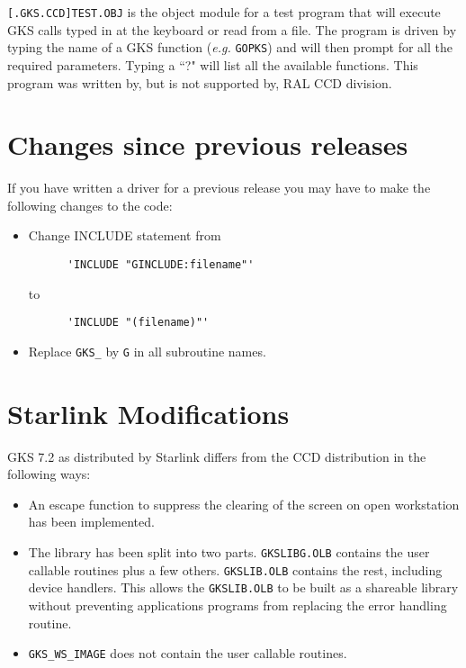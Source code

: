 {\tt [.GKS.CCD]TEST.OBJ} is the object module for a test program that will
execute GKS calls typed in at the keyboard or read from a file. The program is
driven by typing the name of a GKS function ({\em e.g.} {\tt GOPKS}) and will
then prompt for all the required parameters. Typing a ``?" will list all the
available functions. This program was written by, but is not supported by, RAL
CCD division.

\section{Changes since previous releases}

If you have written a driver for a previous release you may have to make the
following changes to the code:

\begin{itemize}

\item Change INCLUDE statement from 
\begin{verbatim}
      'INCLUDE "GINCLUDE:filename"'
\end{verbatim}
to
\begin{verbatim}
      'INCLUDE "(filename)"'
\end{verbatim}

\item Replace {\tt GKS\_} by {\tt G} in all subroutine names.

\end{itemize}

\section{Starlink Modifications}

GKS 7.2 as distributed by Starlink differs from the CCD distribution in
the following ways:

\begin{itemize}

\item An escape function to suppress the clearing of the screen on open
workstation has been implemented.

\item The library has been split into two parts. {\tt GKSLIBG.OLB} contains the
user callable routines plus a few others. {\tt GKSLIB.OLB} contains the rest,
including device handlers. This allows the {\tt GKSLIB.OLB} to be built as a
shareable library without preventing applications programs from replacing the
error handling routine.

\item {\tt GKS\_WS\_IMAGE} does not contain the user callable routines.

\end{itemize}

